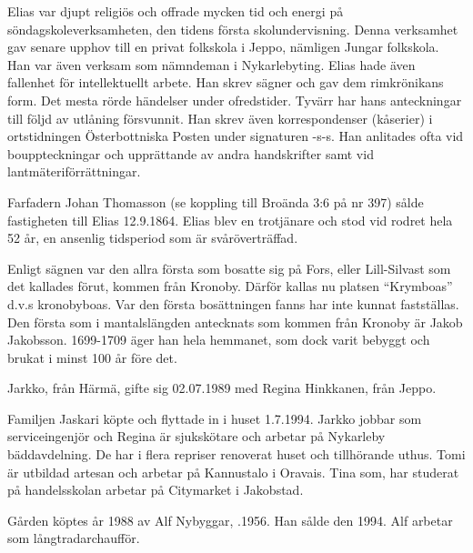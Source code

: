 Elias var djupt religiös och offrade mycken tid och energi på söndagskoleverksamheten, den tidens första skolundervisning. Denna verksamhet gav senare upphov till en privat folkskola i Jeppo, nämligen Jungar folkskola. Han var även verksam som nämndeman i Nykarlebyting. Elias hade även fallenhet för intellektuellt arbete. Han skrev sägner och gav dem rimkrönikans form. Det mesta rörde händelser under ofredstider. Tyvärr har hans anteckningar till följd av utlåning försvunnit. Han skrev även korrespondenser (kåserier) i ortstidningen Österbottniska Posten under signaturen -s-s. Han anlitades  ofta vid bouppteckningar och upprättande av andra handskrifter samt vid lantmäteriförrättningar.

Farfadern Johan Thomasson (se koppling till Broända 3:6 på nr 397) sålde fastigheten till Elias 12.9.1864. Elias blev en trotjänare och stod vid rodret hela 52 år, en ansenlig tidsperiod som är svåröverträffad.

Enligt sägnen var den allra första som bosatte sig på Fors, eller Lill-Silvast som det kallades förut,  kommen från  Kronoby. Därför  kallas nu platsen ``Krymboas'' d.v.s kronobyboas. Var den första bosättningen fanns har inte kunnat fastställas. Den första som i mantalslängden antecknats som kommen från Kronoby är Jakob Jakobsson. 1699-1709 äger han hela hemmanet, som dock varit bebyggt och brukat i minst 100 år före det.




Jarkko,  från Härmä, gifte sig 02.07.1989 med Regina Hinkkanen,  från Jeppo.
\begin{jhchildren}
  \item {}
  \item {}
\end{jhchildren}


Familjen Jaskari köpte och flyttade in i huset 1.7.1994. Jarkko jobbar som serviceingenjör och Regina är sjukskötare och arbetar på Nykarleby bäddavdelning. De har i flera repriser renoverat huset och tillhörande uthus. Tomi är utbildad artesan och arbetar på Kannustalo i Oravais. Tina som, har studerat på handelsskolan arbetar på Citymarket i Jakobstad.


Gården köptes år 1988 av Alf Nybyggar, .1956. Han sålde den 1994. Alf arbetar som långtradarchaufför.


